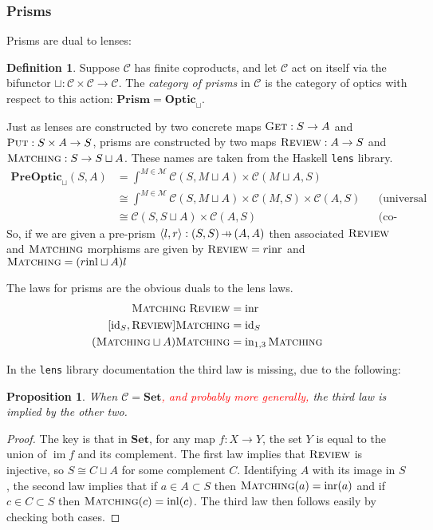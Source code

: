 \documentclass[11pt,a4paper]{article}
\theoremstyle{plain}
\newtheorem{proposition}[theorem]{Proposition}
\theoremstyle{definition}
\newtheorem{definition}[theorem]{Definition}
\newcommand{\C}{\mathscr{C}}
\newcommand{\M}{\mathscr{M}}
\newcommand{\Set}{\mathbf{Set}}
\newcommand{\PreOptic}{\mathbf{PreOptic}}
\newcommand{\Optic}{\mathbf{Optic}}
\newcommand{\Prism}{\mathbf{Prism}}
\newcommand{\id}{\mathrm{id}}
\newcommand{\inl}{\mathrm{inl}}
\newcommand{\inr}{\mathrm{inr}}
\DeclareMathOperator{\im}{im}
\newcommand{\fget}{\textsc{Get}}
\newcommand{\fput}{\textsc{Put}}
\newcommand{\freview}{\textsc{Review}}
\newcommand{\fmatching}{\textsc{Matching}}
\newcommand{\hto}{\ensuremath{\,\mathaccent\shortmid\rightarrow\,}}
\newcommand{\todo}[1]{\textcolor{red}{\small #1}}
\begin{document}
\subsubsection{Prisms}
Prisms are dual to lenses:

\begin{definition}
Suppose $\C$ has finite coproducts, and let $\C$ act on itself via the bifunctor $\sqcup : \C \times \C \to \C$. The \emph{category of prisms} in $\C$ is the category of optics with respect to this action: $\Prism = \Optic_\sqcup$.
\end{definition}

Just as lenses are constructed by two concrete maps $\fget : S \to A$ and $\fput : S \times A \to S$, prisms are constructed by two maps $\freview : A \to S$ and $\fmatching : S \to S \sqcup A$. These names are taken from the Haskell \texttt{lens} library.
\begin{align*}
\PreOptic_\sqcup(S, A) &= \int^{M \in \M} \C(S, M \sqcup A) \times \C(M \sqcup A, S) \\
&\cong \int^{M \in \M} \C(S, M \sqcup A) \times \C(M, S) \times \C(A, S) && \text{(universal property of coproduct)} \\
&\cong \C(S, S \sqcup A) \times \C(A, S) && \text{(co-Yoneda)}
\end{align*}
So, if we are given a pre-prism $\langle l, r \rangle : (S, S) \hto (A, A)$ then associated $\freview$ and $\fmatching$ morphisms are given by $\freview = r \inr$ and $\fmatching = (r\inl \sqcup A)l$

The laws for prisms are the obvious duals to the lens laws. 
\begin{align*}
\fmatching \; \freview &= \inr \\
[\id_S, \freview] \fmatching &= \id_S \\
(\fmatching \sqcup A) \fmatching &= \mathrm{in}_{1,3} \, \fmatching
\end{align*}

In the \texttt{lens} library documentation the third law is missing, due to the following:

\begin{proposition}
When $\C = \Set$\todo{, and probably more generally,} the third law is implied by the other two.
\end{proposition}
\begin{proof}
The key is that in $\Set$, for any map $f : X \to Y$, the set $Y$ is equal to the union of $\im f$ and its complement. The first law implies that $\freview$ is injective, so $S \cong C \sqcup A$ for some complement $C$. Identifying $A$ with its image in $S$, the second law implies that if $a\in A \subset S$ then $\fmatching(a) = \inr(a)$ and if $c\in C \subset S$ then $\fmatching(c) = \inl(c)$. The third law then follows easily by checking both cases.
\end{proof}
\end{document}
